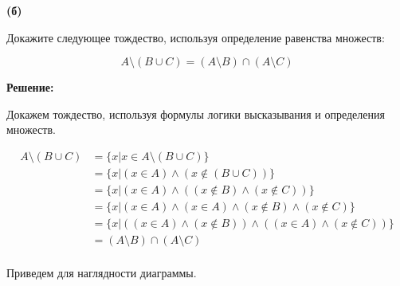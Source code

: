 \documentclass{article}
\begin{document}
\newpage

\textbf{(б)}

Докажите следующее тождество, используя определение равенства множеств:

$$A \setminus (B \cup C) = (A \setminus B) \cap (A \setminus C)$$

\textbf{Решение:}

Докажем тождество, используя формулы логики высказывания и определения множеств. 

\begin{equation} 
\begin{split}
A \setminus (B \cup C) & = \{x | x \in A \setminus (B \cup C) \} \\
 & = \{x | (x \in A) \wedge (x \notin (B \cup C)) \} \\
 & = \{x | (x \in A) \wedge ( (x \notin B) \wedge (x \notin C)) \} \\
 & = \{x | (x \in A) \wedge (x \in A) \wedge (x \notin B) \wedge (x \notin C) \} \\
 & = \{x | ((x \in A) \wedge (x \notin B)) \wedge ((x \in A) \wedge (x \notin C)) \} \\
 & = (A \setminus B) \cap (A \setminus C) \\
\end{split}
\end{equation}


Приведем для наглядности диаграммы. 
\end{document}
